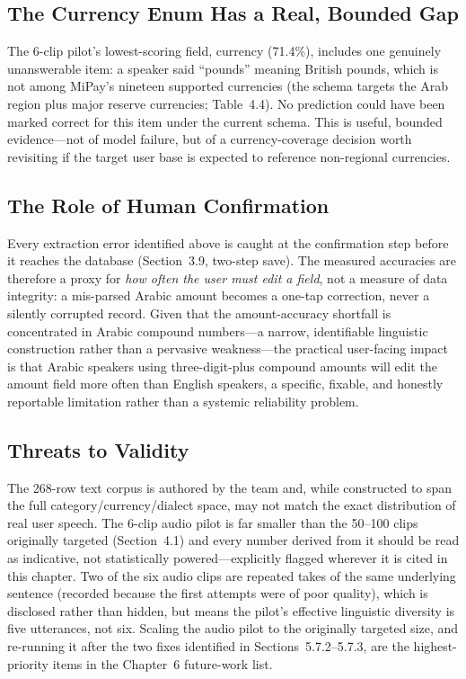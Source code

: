 \subsection{The Currency Enum Has a Real, Bounded Gap}

The 6-clip pilot's lowest-scoring field, currency (71.4\%), includes one
genuinely unanswerable item: a speaker said ``pounds'' meaning British pounds,
which is not among MiPay's nineteen supported currencies (the schema targets
the Arab region plus major reserve currencies; Table~4.4). No prediction could
have been marked correct for this item under the current schema. This is
useful, bounded evidence---not of model failure, but of a currency-coverage
decision worth revisiting if the target user base is expected to reference
non-regional currencies.

\subsection{The Role of Human Confirmation}

Every extraction error identified above is caught at the confirmation step
before it reaches the database (Section~3.9, two-step save). The measured
accuracies are therefore a proxy for \emph{how often the user must edit a
field}, not a measure of data integrity: a mis-parsed Arabic amount becomes a
one-tap correction, never a silently corrupted record. Given that the
amount-accuracy shortfall is concentrated in Arabic compound numbers---a
narrow, identifiable linguistic construction rather than a pervasive
weakness---the practical user-facing impact is that Arabic speakers using
three-digit-plus compound amounts will edit the amount field more often than
English speakers, a specific, fixable, and honestly reportable limitation
rather than a systemic reliability problem.

\subsection{Threats to Validity}

The 268-row text corpus is authored by the team and, while constructed to span
the full category/currency/dialect space, may not match the exact distribution
of real user speech. The 6-clip audio pilot is far smaller than the 50--100
clips originally targeted (Section~4.1) and every number derived from it should
be read as indicative, not statistically powered---explicitly flagged wherever
it is cited in this chapter. Two of the six audio clips are repeated takes of
the same underlying sentence (recorded because the first attempts were of poor
quality), which is disclosed rather than hidden, but means the pilot's
effective linguistic diversity is five utterances, not six. Scaling the audio
pilot to the originally targeted size, and re-running it after the two fixes
identified in Sections~5.7.2--5.7.3, are the highest-priority items in the
Chapter~6 future-work list.
